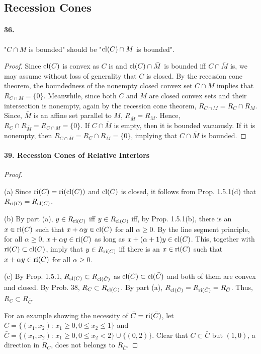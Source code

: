 \subsection{Recession Cones}
  \paragraph{36.}
    "$C\cap M$ is bounded" should be "$\operatorname{cl}(C)\cap M$ is bounded".
  \begin{proof}
    Since $\operatorname{cl}(C)$ is convex as $C$ is and $\operatorname{cl}(C)\cap\bar{M}$ is bounded iff
    $C\cap\bar{M}$ is, we may assume without loss of generality that $C$ is
    closed. By the recession cone theorem, the boundedness of the nonempty 
    closed convex set $C\cap M$ implies that $R_{C\cap M}=\{0\}$. Meanwhile, 
    since both $C$ and $M$ are closed convex sets and their intersection is
    nonempty, again by the recession cone theorem, $R_{C\cap M}=R_C\cap R_M$.
    Since, $\bar{M}$ is an affine set parallel to $M$, $R_{\bar{M}}=R_M$. 
    Hence, $R_C\cap R_{\bar{M}}=R_{C\cap M}=\{0\}$. If $C\cap\bar{M}$ is 
    empty, then it is bounded vacuously. If it is nonempty, then $R_{C\cap
    \bar{M}}=R_C\cap R_{\bar{M}}=\{0\}$, implying that $C\cap\bar{M}$ is
    bounded.
  \end{proof}
  
  \paragraph{39. Recession Cones of Relative Interiors}
  \begin{proof}
    $\,$\par
    (a) Since $\operatorname{ri}(C)=\operatorname{ri}(\operatorname{cl}(C))$ and $\operatorname{cl}(C)$ is closed, it follows from 
    Prop. 1.5.1(d) that $R_{\operatorname{ri}(C)}=R_{\operatorname{cl}(C)}$.\par
    (b) By part (a), $y\in R_{\operatorname{ri}(C)}$ iff $y\in R_{\operatorname{cl}(C)}$ iff, by Prop. 
    1.5.1(b), there is an $x\in\operatorname{ri}(C)$ such that $x+\alpha y\in\operatorname{cl}(C)$ for all
    $\alpha\ge 0$. By the line segment principle, for all $\alpha\ge 0$, $x+
    \alpha y\in\operatorname{ri}(C)$ as long as $x+(\alpha+1)y\in\operatorname{cl}(C)$. This, together 
    with $\operatorname{ri}(C)\subset\operatorname{cl}(C)$, imply that $y\in R_{\operatorname{ri}(C)}$ iff there is an
    $x\in\operatorname{ri}(C)$ such that $x+\alpha y\in\operatorname{ri}(C)$ for all $\alpha\ge 0$.\par
    (c) By Prop. 1.5.1, $R_{\operatorname{cl}(C)}\subset R_{\operatorname{cl}(\bar{C})}$ as $\operatorname{cl}(C)
    \subset \operatorname{cl}(\bar{C})$ and both of them are convex and closed. By Prob. 38,
    $R_C\subset R_{\operatorname{cl}(C)}$. By part (a), $R_{\operatorname{cl}(\bar{C})}=R_{\operatorname{ri}(\bar{C})}
    =R_{\bar{C}}$. Thus, $R_C\subset R_{\bar{C}}$.\par
    For an example showing the necessity of $\bar{C}=\operatorname{ri}(\bar{C})$, let $C=
    \{(x_1,x_2):\, x_1\ge 0, 0\le x_2\le 1\}$ and $\bar{C}=\{(x_1,x_2):\,
    x_1\ge 0, 0\le x_2<2\}\cup\{(0,2)\}$. Clear that $C\subset\bar{C}$ but
    $(1,0)$, a direction in $R_C$, does not belongs to $R_{\bar{C}}$.
  \end{proof}
















